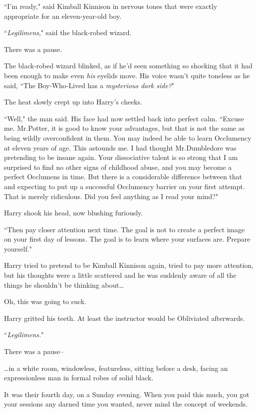 ``I'm ready," said Kimball Kinnison in nervous tones that were exactly appropriate for an eleven-year-old boy.

``\emph{Legilimens}," said the black-robed wizard.

There was a pause.

The black-robed wizard blinked, as if he'd seen something so shocking that it had been enough to make even \emph{his} eyelids move. His voice wasn't quite toneless as he said, ``The Boy-Who-Lived has a \emph{mysterious dark side?}"

The heat slowly crept up into Harry's cheeks.

``Well," the man said. His face had now settled back into perfect calm. ``Excuse me. Mr.\?Potter, it is good to know your advantages, but that is not the same as being wildly overconfident in them. You may indeed be able to learn Occlumency at eleven years of age. This astounds me. I had thought Mr.\?Dumbledore was pretending to be insane again. Your dissociative talent is so strong that I am surprised to find no other signs of childhood abuse, and you may become a perfect Occlumens in time. But there is a considerable difference between that and expecting to put up a successful Occlumency barrier on your first attempt. That is merely ridiculous. Did you feel anything as I read your mind?"

Harry shook his head, now blushing furiously.

``Then pay closer attention next time. The goal is not to create a perfect image on your first day of lessons. The goal is to learn where your surfaces are. Prepare yourself."

Harry tried to pretend to be Kimball Kinnison again, tried to pay more attention, but his thoughts were a little scattered and he was suddenly aware of all the things he shouldn't be thinking about{\ldots}

Oh, this was going to suck.

Harry gritted his teeth. At least the instructor would be Obliviated afterwards.

``\emph{Legilimens.}"

There was a pause\---

\later

{\ldots}in a white room, windowless, featureless, sitting before a desk, facing an expressionless man in formal robes of solid black.

It was their fourth day, on a Sunday evening. When you paid this much, you got your sessions any darned time you wanted, never mind the concept of weekends.

